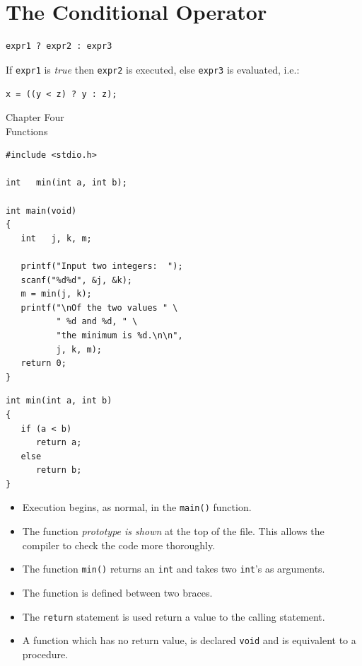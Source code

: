 \documentclass[a4,portraitt]{slides}
\begin{document}
\newpage
\section*{The Conditional Operator}

\begin{verbatim}
expr1 ? expr2 : expr3
\end{verbatim}

If \verb^expr1^ is {\it true} then \verb^expr2^ is executed, else
\verb^expr3^ is evaluated, i.e.:

\verb^x = ((y < z) ? y : z);^

\newpage
\begin{center}
{\Large Chapter Four \\ Functions}
\end{center}

\begin{verbatim}
#include <stdio.h>

int   min(int a, int b);

int main(void)
{
   int   j, k, m;

   printf("Input two integers:  ");
   scanf("%d%d", &j, &k);
   m = min(j, k);
   printf("\nOf the two values " \
          " %d and %d, " \
          "the minimum is %d.\n\n",
          j, k, m);
   return 0;
}
\end{verbatim}

\newpage

\begin{verbatim}
int min(int a, int b)
{
   if (a < b)
      return a;
   else
      return b;
}
\end{verbatim}

\begin{itemize}
\item Execution begins, as normal, in the \verb^main()^ function.
\item The function {\it prototype is shown} at the top of the file.
This allows the compiler to check the code more thoroughly.
\item The function \verb^min()^ returns an \verb^int^ and takes
two \verb^int^'s as arguments.
\item The function is defined between two braces.
\item The \verb^return^ statement is used return a value
to the calling statement.
\item A function which has no return value, is declared \verb^void^
and is equivalent to a procedure.
\end{itemize}
\end{document}
